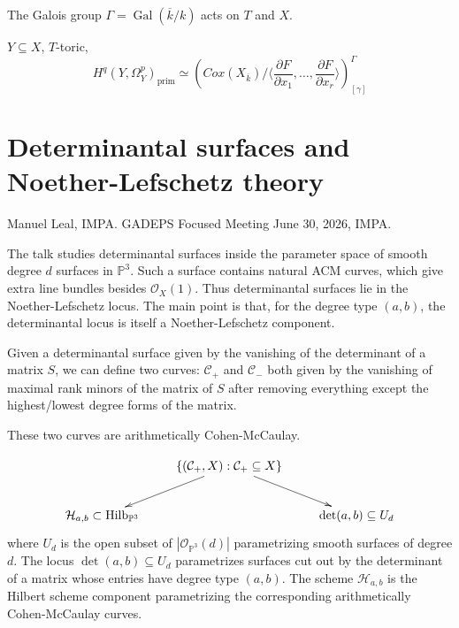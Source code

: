 \noindent
The Galois group $\Gamma=\operatorname{Gal}
(\overline{k}/k)$ acts on $T$ and $X$.

\begin{theorem}
\label{theorem-toric-primitive-hodge}
$Y \subseteq X$, $T$-toric,
$$
H^q(Y,\Omega_Y^p)_{\operatorname{prim}}
\simeq
(Cox(X_{\overline{k}})
/\langle \frac{\partial F}{\partial x_1}
,…,\frac{\partial F}{\partial x_r}\rangle)
^\Gamma_{[\gamma]}
$$
\end{theorem}

\section{Determinantal surfaces
and Noether-Lefschetz theory}
\label{section-determinantal-surfaces-nl}

\noindent
Manuel Leal, IMPA.
GADEPS Focused Meeting June 30, 2026, IMPA.

\medskip\noindent
The talk studies determinantal surfaces
inside the parameter space of smooth
degree $d$ surfaces in $\mathbb{P}^3$.
Such a surface contains natural ACM curves,
which give extra line bundles besides
$\mathcal{O}_X(1)$.
Thus determinantal surfaces lie in the
Noether-Lefschetz locus. The main point is
that, for the degree type $(a,b)$, the
determinantal locus is itself a
Noether-Lefschetz component.

\medskip\noindent
Given a determinantal surface given
by the vanishing of the determinant
of a matrix $S$, we can define two curves:
$\mathcal{C}_+$ and $\mathcal{C}_-$
both given by the vanishing of maximal
rank minors of the matrix of $S$ after
removing everything except the highest/lowest
degree forms of the matrix.

These two curves are arithmetically
Cohen-McCaulay.

\begin{theorem}[L,LH,V, 24]
\label{theorem-llhv24}
$$
\xymatrix{
&\{(\mathcal{C}_+,X):\mathcal{C}_+ \subseteq X\}
\ar[dr]\ar[dl]\\
\mathcal{H}_{a,b}\subset
\operatorname{Hilb}_{\mathbb{P}^3}
& &
\det(a,b) \subseteq U_d
}
$$
where
$U_d$ is the open subset of
$|\mathcal{O}_{\mathbb{P}^3}(d)|$
parametrizing smooth surfaces of degree $d$.
The locus $\det(a,b)\subseteq U_d$
parametrizes surfaces cut out by the
determinant of a matrix whose entries have
degree type $(a,b)$.
The scheme $\mathcal{H}_{a,b}$ is the
Hilbert scheme component parametrizing
the corresponding arithmetically
Cohen-McCaulay curves.
\end{theorem}

